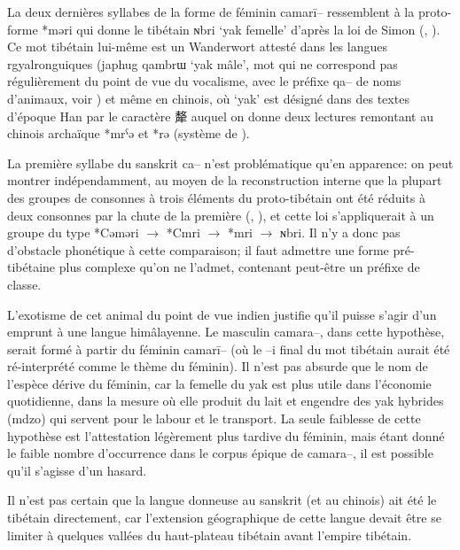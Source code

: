 \documentclass[oldfontcommands,oneside,a4paper,11pt]{article}
\newcommand{\ipa}[1]{{\phon #1}} %
\newcommand{\zh}[1]{{\cn #1}}
\begin{document}
La deux dernières syllabes de la forme de féminin \ipa{camarī--} ressemblent à la proto-forme *\ipa{məri} qui donne le tibétain  \ipa{ɴbri} `yak femelle' d'après la loi de Simon (\citealt[187]{simon29}, \citealt{hill11laws}). Ce mot tibétain lui-même est un Wanderwort attesté dans les langues rgyalronguiques (japhug \ipa{qambrɯ} `yak mâle', mot qui ne correspond pas régulièrement du point de vue du vocalisme, avec le préfixe \ipa{qa--} de noms d'animaux, voir   \citealt[158-9]{jacques14snom}) et même en chinois, où  `yak' est désigné dans des textes d'époque Han par le caractère \zh{犛} auquel on donne deux lectures remontant au chinois archaïque *\ipa{mrˁə} et *\ipa{rə} (système de \citealt{bs14oc}).

La première syllabe du sanskrit \ipa{ca--} n'est problématique qu'en apparence: on peut montrer indépendamment, au moyen de la reconstruction interne que la plupart des groupes de consonnes à trois éléments du proto-tibétain ont été réduits à deux consonnes par la chute de la première (\citealt{coblin76}, \citealt{hill11laws}), et cette loi s'appliquerait à un groupe du type *\ipa{Cəməri} $\rightarrow$ *\ipa{Cmri} $\rightarrow$ *\ipa{mri} $\rightarrow$ \ipa{ɴbri}. Il n'y a donc pas d'obstacle phonétique à cette comparaison; il faut admettre une forme pré-tibétaine plus complexe qu'on ne l'admet, contenant peut-être un préfixe de classe. 
  
L'exotisme de cet animal du point de vue indien justifie qu'il puisse s'agir d'un emprunt à une langue himâlayenne. Le masculin \ipa{camara--}, dans cette hypothèse, serait formé à partir du féminin \ipa{camarī--} (où le \ipa{--i} final du mot tibétain aurait été ré-interprété comme le thème du féminin). Il n'est pas absurde que le nom de l'espèce dérive du féminin, car la femelle du yak est plus utile dans l'économie quotidienne, dans la mesure où elle produit du lait et engendre des yak hybrides (\ipa{mdzo}) qui servent pour le labour et le transport. La seule faiblesse de cette hypothèse est l'attestation légèrement plus tardive du féminin, mais étant donné le faible nombre d'occurrence dans le corpus épique de \ipa{camara--}, il est possible qu'il s'agisse d'un hasard.

Il n'est pas certain que la langue donneuse au sanskrit (et au chinois) ait été le tibétain directement, car l'extension géographique de cette langue devait être se limiter à quelques vallées du haut-plateau tibétain avant l'empire tibétain. 
  


\end{document}
